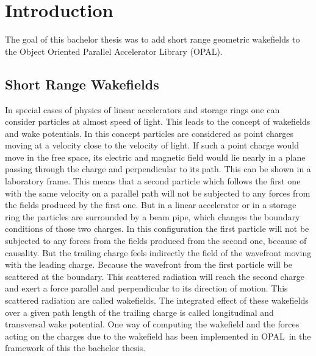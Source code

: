 \documentclass[11pt,a4paper]{article}
\newcommand{\opal}{\textsc{OPAL}}
\begin{document}
\tableofcontents
\thispagestyle{empty}
\newpage
\section{Introduction}
The goal of this bachelor thesis was to add short range geometric wakefields to the Object Oriented Parallel Accelerator Library (\opal). 

\subsection{Short Range Wakefields}
In special cases of physics of linear accelerators and storage rings one can consider particles at almost speed of light. This leads to the concept of wakefields and wake potentials. In this concept particles are considered as point charges moving at a velocity close to the velocity of light. If such a point charge would move in the free space, its electric and magnetic field would lie nearly in a plane passing through the charge and perpendicular to its path. This can be shown in a laboratory frame. This means that a second particle which follows the first one with the same velocity on a parallel path  will not be subjected to any forces from the fields produced by the first one. But in a linear accelerator or in a storage ring the particles are surrounded by a beam pipe, which changes the boundary conditions of those two charges. In this configuration the first particle will  not be subjected to any forces from the fields produced from the second one, because of causality. But the trailing charge feels indirectly the field of the wavefront moving with the leading charge. Because the wavefront from the first particle will be scattered at the boundary. This scattered radiation will reach the second charge and exert a force parallel and perpendicular to its direction of motion. This scattered radiation are called wakefields. The integrated effect of these wakefields over a given path length of the trailing charge is called longitudinal and transversal wake potential. One way of computing the wakefield and the forces acting on the charges due to the wakefield has been implemented in \opal\ in the framework of this the bachelor thesis. 
\end{document}
